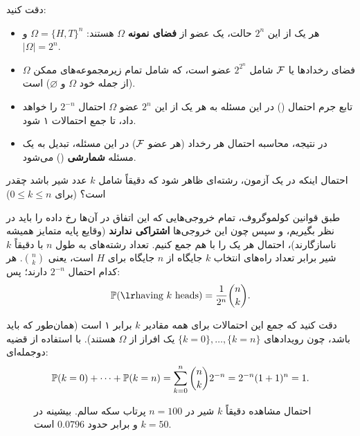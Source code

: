 دقت کنید:
\begin{itemize}
\item هر یک از این $2^n$ حالت، یک عضو از \textbf{فضای نمونه} $\Omega$ هستند: $\Omega=\{H,T\}^n$ و $|\Omega|=2^n$.
\item فضای رخدادها یا $\mathcal{F}$ شامل $2^{2^n}$ عضو است، که شامل تمام زیرمجموعه‌های ممکن $\Omega$ (از جمله خود $\Omega$ و $\varnothing$) است.
\item تابع جرم احتمال () در این مسئله به هر یک از این $2^n$ عضو $\Omega$ احتمال $2^{-n}$ را خواهد داد، تا جمع احتمالات ۱ شود.
\item در نتیجه، محاسبه احتمال هر رخداد (هر عضو $\mathcal{F}$) در این مسئله، تبدیل به یک مسئله \textbf{شمارشی} () می‌شود.
\end{itemize}

\begin{example}
احتمال اینکه در یک آزمون، رشته‌ای ظاهر شود که دقیقاً شامل $k$ عدد شیر باشد چقدر است؟ (برای $0\le k\le n$)
\begin{solution}
طبق قوانین کولموگروف، تمام خروجی‌هایی که این اتفاق در آن‌ها رخ داده را باید در نظر بگیریم، و سپس چون این خروجی‌ها \textbf{اشتراکی ندارند} (وقایع پایه متمایز همیشه ناسازگارند)، احتمال هر یک را با هم جمع کنیم. تعداد رشته‌های به طول $n$ با دقیقاً $k$ شیر برابر تعداد راه‌های انتخاب $k$ جایگاه از $n$ جایگاه برای $H$ است، یعنی $\binom nk$. هر کدام احتمال $2^{-n}$ دارند؛ پس:
\[
\Prob(\mtxt{having $k$ heads})=\frac{1}{2^n}\binom{n}{k}.
\]
\end{solution}
\end{example}

دقت کنید که جمع این احتمالات برای همه مقادیر $k$ برابر ۱ است (همان‌طور که باید باشد، چون رویدادهای $\{k=0\},\ldots,\{k=n\}$ یک افراز از $\Omega$ هستند). با استفاده از قضیه دوجمله‌ای:
\[
\mathbb{P}(k=0)+\cdots+\mathbb{P}(k=n)=\sum_{k=0}^{n}\binom nk2^{-n}=2^{-n}(1+1)^n=1 .
\]

\begin{figure}[H]
\centering
{}
\caption{احتمال مشاهده دقیقاً $k$ شیر در $n=100$ پرتاب سکه سالم. بیشینه در $k=50$ و برابر حدود $0.0796$ است.}
\label{fig:binom100}
\end{figure}

